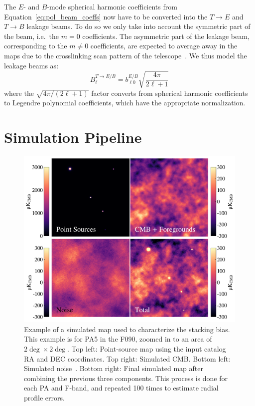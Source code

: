 The $E$- and $B$-mode spherical harmonic coefficients from Equation~\ref{eq:pol_beam_coeffs} now have to be converted into the $T\rightarrow E$ and $T\rightarrow B$ leakage beams. To do so we only take into account the symmetric part of the beam, i.e.\ the $m=0$ coefficients. The asymmetric part of the leakage beam, corresponding to the $m\neq0$  coefficients, are expected to average away in the maps due to the crosslinking scan pattern of the telescope~\cite{Lungu_2022}. We thus model the leakage beams as:
\begin{equation}
B^{T\rightarrow E/B}_{\ell} = b^{E/B}_{\ell 0} \sqrt{\frac{4 \pi}{2 \ell + 1}}
\end{equation}
where the $\sqrt{4 \pi / (2 \ell + 1)}$ factor converts from spherical harmonic coefficients to Legendre polynomial coefficients, which have the appropriate normalization. 

\section{Simulation Pipeline}
\label{sec:sim_pipe}

\begin{figure}[t!]
    \centering
    \includegraphics[width=\linewidth]{Figures/simmap.pdf}
    \caption{Example of a simulated map used to characterize the stacking bias.  This example is for PA5 in the F090, zoomed in to an area of $2\deg\times2\deg$.  Top left: Point-source map using the input catalog RA and DEC coordinates.  Top right:  Simulated CMB.  Bottom left:  Simulated noise~\cite{atkins}.  Bottom right: Final simulated map after combining the previous three components.  This process is done for each PA and F-band, and repeated 100 times to estimate radial profile errors.
    }
    \label{fig:sim_map}
\end{figure}

